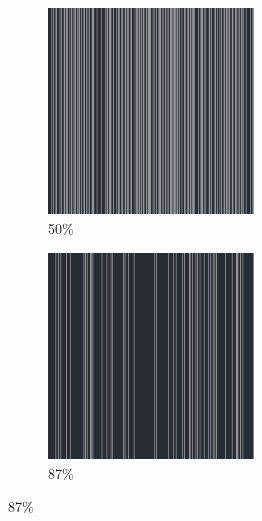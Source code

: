 \documentclass[12pt, fleqn]{report}                             %
\theoremstyle{break}                                            %
\begin{document}
\begin{figure}[ht!]
\begin{subfigure}[b]{0.4\linewidth}
          \includegraphics[width=0.6\textwidth]{Images/12/c.png}
          \caption{50\%}
        \end{subfigure}
        \begin{subfigure}[b]{0.4\linewidth}
          \includegraphics[width=0.6\textwidth]{Images/12/d.png}
          \caption{87\%}
        \end{subfigure}
      \end{figure}
\end{document}
